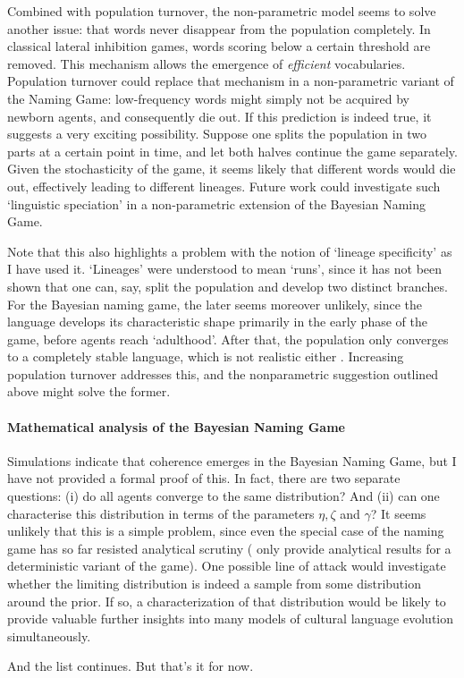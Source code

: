\documentclass{../src/bcthesispart}
\begin{document}
Combined with population turnover, the non-parametric model seems to solve another issue: that words never disappear from the population completely.
In classical lateral inhibition games, words scoring below a certain threshold are removed.
This mechanism allows the emergence of \emph{efficient} vocabularies.
Population turnover could replace that mechanism in a non-parametric variant of the Naming Game: low-frequency words might simply not be acquired by newborn agents, and consequently die out.
If this prediction is indeed true, it suggests a very exciting possibility.
Suppose one splits the population in two parts at a certain point in time, and let both halves continue the game separately.
Given the stochasticity of the game, it seems likely that different words would die out, effectively leading to different lineages.
Future work could investigate such ‘linguistic speciation’ in a non-parametric extension of the Bayesian Naming Game.





Note that this also highlights a problem with the notion of ‘lineage specificity’ as I have used it.
‘Lineages’ were understood to mean ‘runs’, since it has not been shown that one can, say, split the population and develop two distinct branches.
For the Bayesian naming game, the later seems moreover unlikely, since the language develops its characteristic shape primarily in the early phase of the game, before agents reach ‘adulthood’.
After that, the population only converges to a completely stable language, which is not realistic either \parencite{Kirby2001}.
Increasing population turnover addresses this, and the nonparametric suggestion outlined above might solve the former.





\paragraph{Mathematical analysis of the Bayesian Naming Game}

Simulations indicate that coherence emerges in the Bayesian Naming Game, but I have not provided a formal proof of this.
In fact, there are two separate questions: (i) do all agents converge to the same distribution? 
And (ii) can one characterise this distribution in terms of the parameters $\eta, \zeta$ and $\gamma$?
It seems unlikely that this is a simple problem, since even the special case of the naming game has so far resisted analytical scrutiny (\textcite{DeVylder2006} only provide analytical results for a deterministic variant of the game).
One possible line of attack would investigate whether the limiting distribution is indeed a sample from some distribution around the prior.
If so, a characterization of that distribution would be likely to provide valuable further insights into many models of cultural language evolution simultaneously.


\bigbreak\noindent
And the list continues. 
But that’s it for now.
\end{document}
